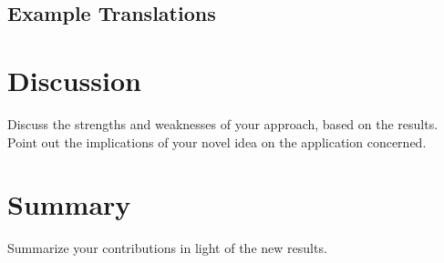 \documentclass[11pt,a4paper]{article}
\begin{document}
\subsection{Example Translations}
\section{Discussion}\label{sec:discussion}
Discuss the strengths and weaknesses of your approach, based on the results. Point out the implications of your novel idea on the application concerned.
\section{Summary}\label{sec:conclusions}
Summarize your contributions in light of the new results.

\end{document}
